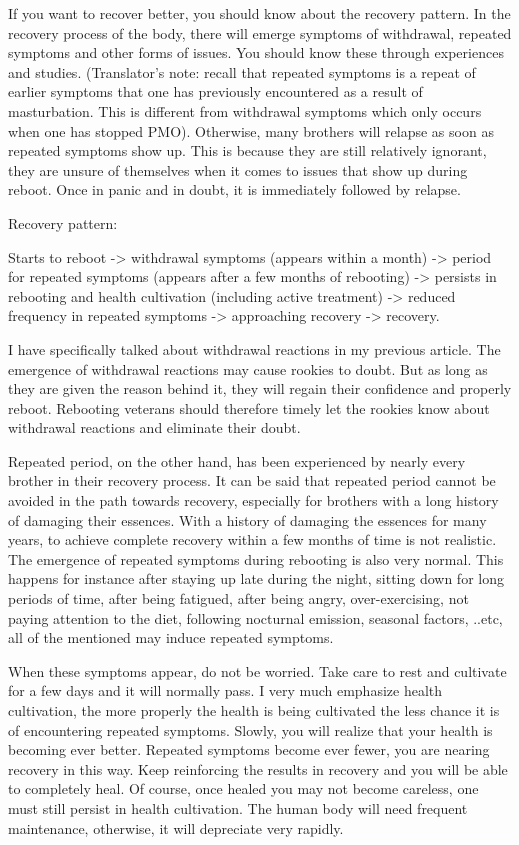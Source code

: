 \documentclass[
]{book}
\begin{document}
If you want to recover better, you should know about the recovery pattern. In the recovery process of the body, there will emerge symptoms of withdrawal, repeated symptoms and other forms of issues. You should know these through experiences and studies. (Translator's note: recall that repeated symptoms is a repeat of earlier symptoms that one has previously encountered as a result of masturbation. This is different from withdrawal symptoms which only occurs when one has stopped PMO). Otherwise, many brothers will relapse as soon as repeated symptoms show up. This is because they are still relatively ignorant, they are unsure of themselves when it comes to issues that show up during reboot. Once in panic and in doubt, it is immediately followed by relapse.

Recovery pattern:

Starts to reboot -\textgreater{} withdrawal symptoms (appears within a month) -\textgreater{} period for repeated symptoms (appears after a few months of rebooting) -\textgreater{} persists in rebooting and health cultivation (including active treatment) -\textgreater{} reduced frequency in repeated symptoms -\textgreater{} approaching recovery -\textgreater{} recovery.

I have specifically talked about withdrawal reactions in my previous article. The emergence of withdrawal reactions may cause rookies to doubt. But as long as they are given the reason behind it, they will regain their confidence and properly reboot. Rebooting veterans should therefore timely let the rookies know about withdrawal reactions and eliminate their doubt.

Repeated period, on the other hand, has been experienced by nearly every brother in their recovery process. It can be said that repeated period cannot be avoided in the path towards recovery, especially for brothers with a long history of damaging their essences. With a history of damaging the essences for many years, to achieve complete recovery within a few months of time is not realistic. The emergence of repeated symptoms during rebooting is also very normal. This happens for instance after staying up late during the night, sitting down for long periods of time, after being fatigued, after being angry, over-exercising, not paying attention to the diet, following nocturnal emission, seasonal factors, ..etc, all of the mentioned may induce repeated symptoms.

When these symptoms appear, do not be worried. Take care to rest and cultivate for a few days and it will normally pass. I very much emphasize health cultivation, the more properly the health is being cultivated the less chance it is of encountering repeated symptoms. Slowly, you will realize that your health is becoming ever better. Repeated symptoms become ever fewer, you are nearing recovery in this way. Keep reinforcing the results in recovery and you will be able to completely heal. Of course, once healed you may not become careless, one must still persist in health cultivation. The human body will need frequent maintenance, otherwise, it will depreciate very rapidly.
\end{document}
